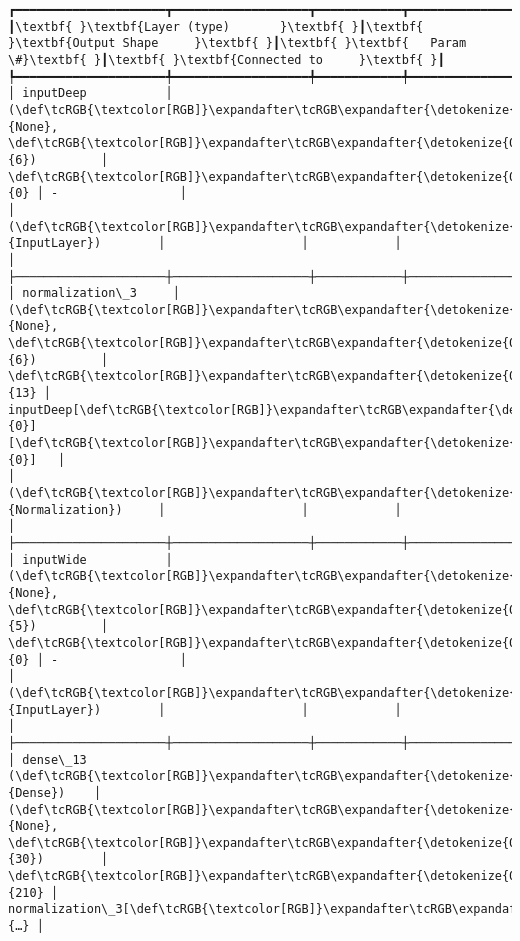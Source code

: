 \documentclass[12pt letter]{report}
\begin{document}
    
    
    \begin{Verbatim}[commandchars=\\\{\}]
┏━━━━━━━━━━━━━━━━━━━━━┳━━━━━━━━━━━━━━━━━━━┳━━━━━━━━━━━━┳━━━━━━━━━━━━━━━━━━━┓
┃\textbf{ }\textbf{Layer (type)       }\textbf{ }┃\textbf{ }\textbf{Output Shape     }\textbf{ }┃\textbf{ }\textbf{   Param \#}\textbf{ }┃\textbf{ }\textbf{Connected to     }\textbf{ }┃
┡━━━━━━━━━━━━━━━━━━━━━╇━━━━━━━━━━━━━━━━━━━╇━━━━━━━━━━━━╇━━━━━━━━━━━━━━━━━━━┩
│ inputDeep           │ (\def\tcRGB{\textcolor[RGB]}\expandafter\tcRGB\expandafter{\detokenize{0,215,255}}{None}, \def\tcRGB{\textcolor[RGB]}\expandafter\tcRGB\expandafter{\detokenize{0,175,0}}{6})         │          \def\tcRGB{\textcolor[RGB]}\expandafter\tcRGB\expandafter{\detokenize{0,175,0}}{0} │ -                 │
│ (\def\tcRGB{\textcolor[RGB]}\expandafter\tcRGB\expandafter{\detokenize{0,135,255}}{InputLayer})        │                   │            │                   │
├─────────────────────┼───────────────────┼────────────┼───────────────────┤
│ normalization\_3     │ (\def\tcRGB{\textcolor[RGB]}\expandafter\tcRGB\expandafter{\detokenize{0,215,255}}{None}, \def\tcRGB{\textcolor[RGB]}\expandafter\tcRGB\expandafter{\detokenize{0,175,0}}{6})         │         \def\tcRGB{\textcolor[RGB]}\expandafter\tcRGB\expandafter{\detokenize{0,175,0}}{13} │ inputDeep[\def\tcRGB{\textcolor[RGB]}\expandafter\tcRGB\expandafter{\detokenize{0,175,0}}{0}][\def\tcRGB{\textcolor[RGB]}\expandafter\tcRGB\expandafter{\detokenize{0,175,0}}{0}]   │
│ (\def\tcRGB{\textcolor[RGB]}\expandafter\tcRGB\expandafter{\detokenize{0,135,255}}{Normalization})     │                   │            │                   │
├─────────────────────┼───────────────────┼────────────┼───────────────────┤
│ inputWide           │ (\def\tcRGB{\textcolor[RGB]}\expandafter\tcRGB\expandafter{\detokenize{0,215,255}}{None}, \def\tcRGB{\textcolor[RGB]}\expandafter\tcRGB\expandafter{\detokenize{0,175,0}}{5})         │          \def\tcRGB{\textcolor[RGB]}\expandafter\tcRGB\expandafter{\detokenize{0,175,0}}{0} │ -                 │
│ (\def\tcRGB{\textcolor[RGB]}\expandafter\tcRGB\expandafter{\detokenize{0,135,255}}{InputLayer})        │                   │            │                   │
├─────────────────────┼───────────────────┼────────────┼───────────────────┤
│ dense\_13 (\def\tcRGB{\textcolor[RGB]}\expandafter\tcRGB\expandafter{\detokenize{0,135,255}}{Dense})    │ (\def\tcRGB{\textcolor[RGB]}\expandafter\tcRGB\expandafter{\detokenize{0,215,255}}{None}, \def\tcRGB{\textcolor[RGB]}\expandafter\tcRGB\expandafter{\detokenize{0,175,0}}{30})        │        \def\tcRGB{\textcolor[RGB]}\expandafter\tcRGB\expandafter{\detokenize{0,175,0}}{210} │ normalization\_3[\def\tcRGB{\textcolor[RGB]}\expandafter\tcRGB\expandafter{\detokenize{0,175,0}}{…} │

\end{Verbatim}
\end{document}
